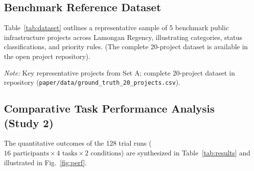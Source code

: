 \documentclass[runningheads]{llncs}
\begin{document}
\subsection{Benchmark Reference Dataset}
Table~\ref{tab:dataset} outlines a representative sample of 5 benchmark public infrastructure projects across Lamongan Regency, illustrating categories, status classifications, and priority rules. (The complete 20-project dataset is available in the open project repository).

\begin{table}[t]
\centering
\caption{Representative Sample of Benchmark Public Infrastructure Projects in Lamongan Regency (Ground Truth Baseline at $T_{ref} = \text{15 October 2024}$).}
\label{tab:dataset}
\vspace{1.5pt}
{\raggedright\scriptsize\emph{Note:} Key representative projects from Set A; complete 20-project dataset in repository (\texttt{paper/data/ground\_truth\_20\_projects.csv}).\par}
\end{table}

\subsection{Comparative Task Performance Analysis (Study 2)}
The quantitative outcomes of the 128 trial runs ($16\text{ participants} \times 4\text{ tasks} \times 2\text{ conditions}$) are synthesized in Table~\ref{tab:results} and illustrated in Fig.~\ref{fig:perf}.
\end{document}
